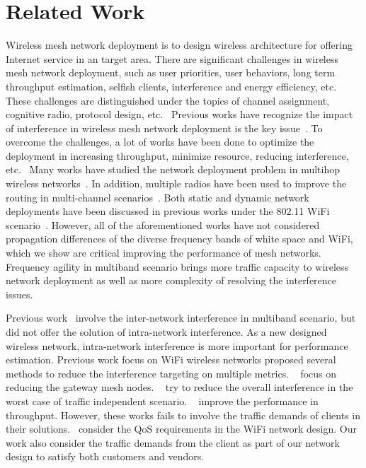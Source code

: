 \section{Related Work}
\label{sec:related}

Wireless mesh network deployment is to design wireless architecture
for offering Internet service in an target area.
There are significant challenges in wireless mesh network deployment,
such as user priorities, user behaviors, long term throughput estimation, selfish clients,
interference and energy efficiency, etc.~\cite{tragos2013spectrum}
These challenges are distinguished under the topics of channel assignment,
cognitive radio, protocol design, etc.~\cite{tragos2013spectrum,akyildiz2006next}
Previous works have recognize the impact of interference in 
wireless mesh network deployment is the key issue~\cite{tang2005interference,irwin2013resource,chieochan2013channel}.
To overcome the challenges, a lot of works have been done to optimize the 
deployment in increasing throughput, minimize resource, reducing interference,
etc.~\cite{irwin2013resource,subramanian2008minimum,doraghinejad2014channel}
Many works have studied the network deployment problem in multihop wireless
networks~\cite{jain2005impact,akyildiz2005wireless,raniwala2004centralized,tragos2013spectrum}.
In addition, multiple radios have been used to improve the routing in multi-channel
scenarios~\cite{draves2004routing,irwin2013resource}. 
Both static and dynamic network deployments have been discussed in previous works under
the 802.11 WiFi scenario~\cite{wu2006analysis,ramachandran2006interference,subramanian2008minimum}. 
However, all of the aforementioned works have not considered propagation 
differences of the diverse frequency bands of white space and WiFi, which we show are 
critical improving the performance of mesh networks.
Frequency agility in multiband scenario brings more traffic capacity to 
wireless network deployment as well as more complexity of resolving the interference issues.

Previous work~\cite{pcuiwinmee} involve the inter-network interference in
multiband scenario, but did not offer the solution of intra-network interference.
As a new designed wireless network, intra-network interference is 
more important for performance estimation. Previous work focus on
WiFi wireless networks proposed several methods to reduce the 
interference targeting on multiple metrics.
~\cite{tang2005interference,he2008optimizing,robinson2010deploying}
focus on reducing the gateway mesh nodes. ~\cite{irwin2013resource,subramanian2008minimum} try to reduce the
overall interference in the worst case of traffic independent scenario.
~\cite{chieochan2013channel,li2012channel} improve the performance
in throughput. However, these works fails to involve the traffic demands
of clients in their solutions.~\cite{robinson2010deploying,long2013fair} consider
the QoS requirements in the WiFi network design. Our work also
consider the traffic demands from the client as part of our 
network design to satisfy both customers and vendors.



